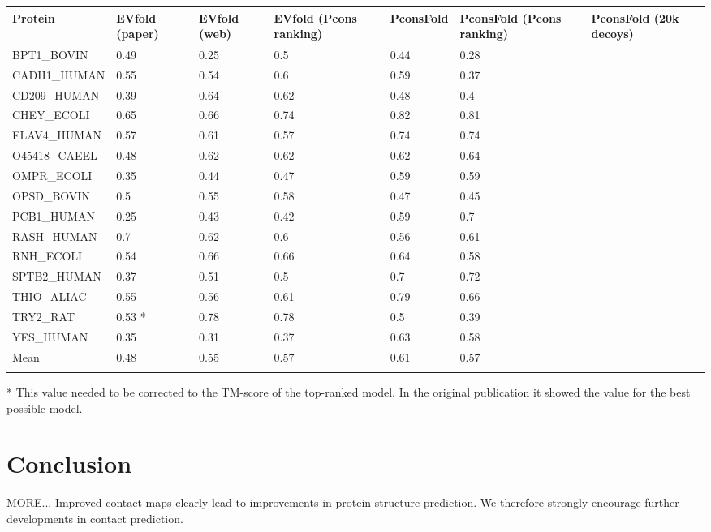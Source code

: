 \documentclass{bioinfo}
\begin{document}
\begin{table}[!t]
{\begin{tabular}{lllllll}\toprule
Protein & EVfold (paper) & EVfold (web) & EVfold (Pcons ranking) & PconsFold & PconsFold (Pcons ranking) & PconsFold (20k decoys)\\\midrule
BPT1\_BOVIN & 0.49 & 0.25 & 0.5 & 0.44 & 0.28 & ~ \\
CADH1\_HUMAN & 0.55 & 0.54 & 0.6 & 0.59 & 0.37& ~ \\
CD209\_HUMAN & 0.39 & 0.64 & 0.62 & 0.48 & 0.4& ~ \\
CHEY\_ECOLI & 0.65 & 0.66 & 0.74 & 0.82 &  0.81& ~ \\
ELAV4\_HUMAN & 0.57 & 0.61 & 0.57 & 0.74 & 0.74& ~ \\
O45418\_CAEEL & 0.48 & 0.62 & 0.62 & 0.62 & 0.64& ~ \\
OMPR\_ECOLI & 0.35 & 0.44 & 0.47 & 0.59 & 0.59& ~ \\
OPSD\_BOVIN & 0.5 & 0.55 & 0.58 & 0.47 & 0.45& ~ \\
PCB1\_HUMAN & 0.25 & 0.43 & 0.42 & 0.59 & 0.7& ~ \\
RASH\_HUMAN & 0.7 & 0.62 & 0.6 & 0.56 & 0.61& ~ \\
RNH\_ECOLI & 0.54 & 0.66 & 0.66 & 0.64 & 0.58& ~ \\
SPTB2\_HUMAN & 0.37 & 0.51 & 0.5 & 0.7 & 0.72& ~ \\
THIO\_ALIAC & 0.55 & 0.56 & 0.61 & 0.79 & 0.66& ~ \\
TRY2\_RAT & 0.53 * & 0.78 & 0.78 & 0.5 & 0.39& ~ \\
YES\_HUMAN & 0.35 & 0.31 & 0.37 & 0.63 & 0.58& ~ \\ \midrule
Mean & 0.48 & 0.55 & 0.57 & 0.61 & 0.57& ~ \\ \botrule
\end{tabular}}{* This value needed to be corrected to the TM-score of the top-ranked model. In the original publication it showed the value for the best possible model.}
\end{table}

\section{Conclusion}
MORE... Improved contact maps clearly lead to improvements in protein structure prediction. We therefore strongly encourage further developments in contact prediction.
\end{document}
